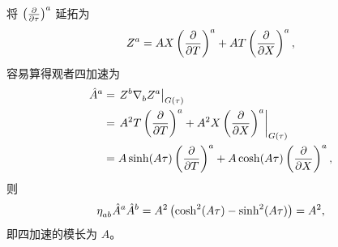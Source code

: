 \begin{xiti}
\begin{zm}
\begin{enumerate}[label=(\alph*)]
				将 $\tensor{\left( \pdv{\tau} \right)}{^a}$ 延拓为
				\begin{equation*}
					\tensor{Z}{^a} = A X \tensor{\left( \pdv{T} \right)}{^a} + A T \tensor{\left( \pdv{X} \right)}{^a},
				\end{equation*}
				容易算得观者四加速为
				\begin{equation*}
					\begin{split}
						\tensor{\hat{A}}{^a} &= \left. \tensor{Z}{^b} \Nabla{b} \tensor{Z}{^a}\right|_{G(\tau)}\\
						&= \left. A^2 T \tensor{\left( \pdv{T} \right)}{^a} + A^2 X \tensor{\left( \pdv{X} \right)}{^a} \right|_{G(\tau)}\\
						&= A \sinh(A\tau) \tensor{\left( \pdv{T} \right)}{^a} + A \cosh(A\tau) \tensor{\left( \pdv{X} \right)}{^a},
					\end{split}
				\end{equation*}
				则
				\begin{equation*}
					\tensor{\eta}{_a_b} \tensor{\hat{A}}{^a} \tensor{\hat{A}}{^b} = A^2 \left( \cosh[2](A\tau) - \sinh[2](A\tau) \right) = A^2,
				\end{equation*}
				即四加速的模长为 $A$。


\end{enumerate}
\end{zm}
\end{xiti}
